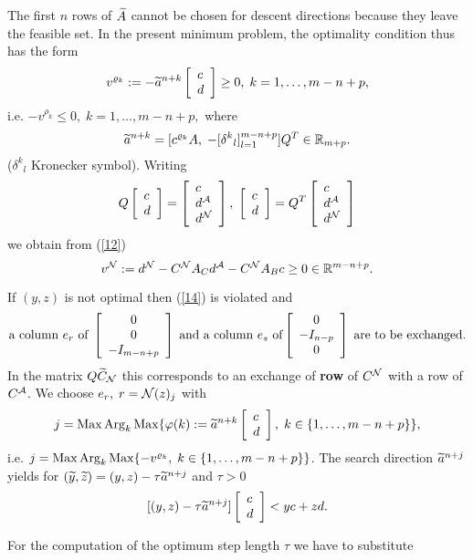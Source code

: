 The first $n$ rows of $\wi{A}$ cannot be chosen for descent
directions because they leave the feasible set.
In the present minimum problem, the optimality condition thus has the form
%
\begin{equation} \label{12}
v^{\rho _k} := - \wi{a}^{n+k}\ba{[}{l}c \\ d\ea{]} \geq 0, \; k = 1, \ldots,
m-n+p, \end{equation}
%
i.e. $- v^{\rho _k} \leq 0, \; k = 1, \ldots, m-n+p,$ where
%
\begin{equation} \label{13}
\wi{a}^{n+k}
= [c^{\rho _k}A, \; - [\delta ^k{}_l]_{l=1}^{m-n+p}]Q^T \in \Bbb{R}_{m+p}.
\end{equation}
%
($\delta ^k{}_l$ {\sc Kronecker} symbol). Writing
\[
Q\ba{[}{l}c\\ d\ea{]} = \ba{[}{l}c\\d^{\A}\\d^{\N}\ea{]},
\; \ba{[}{l}c\\ d \ea{]} = Q^T\ba{[}{l}c\\d^{\A}\\d^{\N}\ea{]}
\]
we obtain from (\ref{12})
%
\begin{equation} \label{14}
v^{\N} := d^{\N} - C^{\N}A_Cd^{\A} - C^{\N}A_Bc \geq 0 \in \Bbb{R}^{m-n+p}.
\end{equation}
\par
If $(y, z)$ is not optimal then (\ref{14}) is violated and
%
\[
\mbox{a column $e_r$ of} \;\ba{[}{c}0\\ 0\\- I_{m-n+p}\ea{]} \;
\mbox{and a column $e_s$ of} \ba{[}{c} 0\\
- I_{n-p}\\ 0 \ea{]} \; \mbox{are to be exchanged}.
\]
In the matrix $Q\wi{C}_{\N}$ this corresponds to an exchange of
{\bf row} of $C^{\N}$ with a row of $C^{\A}$.
We choose  $e_r, \; r = \N(z)_j$ with
%
\begin{equation} \label{15}
j = \Max \Arg_k \Max \{\phi(k) := \wi{a}^{n+k} \ba{[}{l}c \\ d \ea{]}, \; k
\in \{1, \ldots, m - n + p\}\},
\end{equation}
%
i.e. $j = \Max \Arg_k \Max \{- v^{\rho _k}, \; k \in \{1, \ldots, m-n+p\}\}$.
The search direction
$\wi{a}^{n+j}$ yields for $(\wi{y}, \wi{z}) = (y, z) -
\tau \wi{a}^{n+j}$ and $\tau > 0$
\[
[(y,z) - \tau \wi{a}^{n+j}]\ba{[}{l}c \\ d\ea{]}
<  yc + zd. \]
\par
For the computation of the optimum step length $\tau $ we have to substitute
